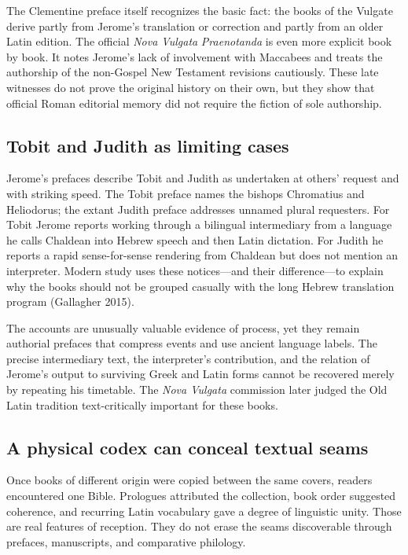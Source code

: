 The Clementine preface itself recognizes the basic fact: the books of the Vulgate derive partly from Jerome's translation or correction and partly from an older Latin edition. The official \emph{Nova Vulgata} \emph{Praenotanda} is even more explicit book by book. It notes Jerome's lack of involvement with Maccabees and treats the authorship of the non-Gospel New Testament revisions cautiously. These late witnesses do not prove the original history on their own, but they show that official Roman editorial memory did not require the fiction of sole authorship.

\subsection{Tobit and Judith as limiting cases}

Jerome's prefaces describe Tobit and Judith as undertaken at others' request and with striking speed. The Tobit preface names the bishops Chromatius and Heliodorus; the extant Judith preface addresses unnamed plural requesters. For Tobit Jerome reports working through a bilingual intermediary from a language he calls Chaldean into Hebrew speech and then Latin dictation. For Judith he reports a rapid sense-for-sense rendering from Chaldean but does not mention an interpreter. Modern study uses these notices---and their difference---to explain why the books should not be grouped casually with the long Hebrew translation program (Gallagher 2015).

The accounts are unusually valuable evidence of process, yet they remain authorial prefaces that compress events and use ancient language labels. The precise intermediary text, the interpreter's contribution, and the relation of Jerome's output to surviving Greek and Latin forms cannot be recovered merely by repeating his timetable. The \emph{Nova Vulgata} commission later judged the Old Latin tradition text-critically important for these books.

\subsection{A physical codex can conceal textual seams}

Once books of different origin were copied between the same covers, readers encountered one Bible. Prologues attributed the collection, book order suggested coherence, and recurring Latin vocabulary gave a degree of linguistic unity. Those are real features of reception. They do not erase the seams discoverable through prefaces, manuscripts, and comparative philology.

